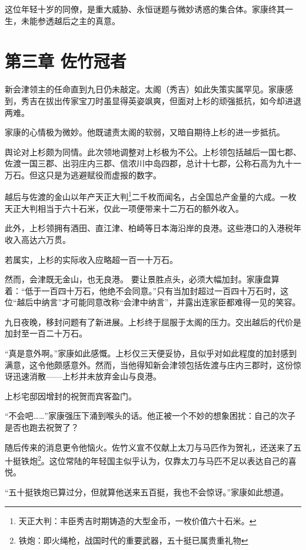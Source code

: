 \documentclass[
]{book}
\begin{document}
这位年轻十岁的同僚，是重大威胁、永恒谜题与微妙诱惑的集合体。家康终其一生，未能参透越后之主的真意。

\chapter*{第三章 佐竹冠者}\label{ux7b2cux4e09ux7ae0-ux4f50ux7af9ux51a0ux8005}

新会津领主的任命直到九日仍未敲定。太阁（秀吉）如此失策实属罕见。家康感到，秀吉在拔出传家宝刀时虽显得英姿飒爽，但面对上杉的顽强抵抗，如今却进退两难。

家康的心情极为微妙。他既谴责太阁的软弱，又暗自期待上杉的进一步抵抗。

舆论对上杉颇为同情。此次领地调整对上杉极为不公。上杉领包括越后一国七郡、佐渡一国三郡、出羽庄内三郡、信浓川中岛四郡，总计十七郡，公称石高为九十一万石。但这只是为逃避赋役而虚报的数字。

越后与佐渡的金山以年产天正大判\footnote{天正大判：丰臣秀吉时期铸造的大型金币，一枚价值六十石米。}二千枚而闻名，占全国总产金量的六成。一枚天正大判相当于六十石米，仅此一项便带来十二万石的额外收入。

此外，上杉领拥有酒田、直江津、柏崎等日本海沿岸的良港。这些港口的入港税年收入高达六万贯。

若属实，上杉的实际收入应略超一百一十万石。

然而，会津既无金山，也无良港。
要让景胜点头，必须大幅加封。家康盘算着：``低于一百四十万石，他绝不会同意。''只有当加封超过一百四十万石时，这位``越后中纳言''才可能同意改称``会津中纳言''，并露出连家臣都难得一见的笑容。

九日夜晚，移封问题有了新进展。上杉终于屈服于太阁的压力。交出越后的代价是加封至一百二十万石。

``真是意外啊。''家康如此感慨。上杉仅三天便妥协，且似乎对如此程度的加封感到满意，这令他颇感意外。然而，当他得知新会津领包括佐渡与庄内三郡时，这份惊讶迅速消散------上杉并未放弃金山与良港。

上杉宅邸因增封的祝贺而宾客盈门。

``不会吧\ldots\ldots{}''家康强压下涌到喉头的话。他正被一个不妙的想象困扰：自己的次子是否也跑去祝贺了？

随后传来的消息更令他恼火。佐竹义宣不仅献上太刀与马匹作为贺礼，还送来了五十挺铁炮\footnote{铁炮：即火绳枪，战国时代的重要武器，五十挺已属贵重礼物}。这位常陆的年轻国主似乎认为，仅靠太刀与马匹不足以表达自己的喜悦。

``五十挺铁炮已算过分，但就算他送来五百挺，我也不会惊讶。''家康如此想道。
\end{document}
